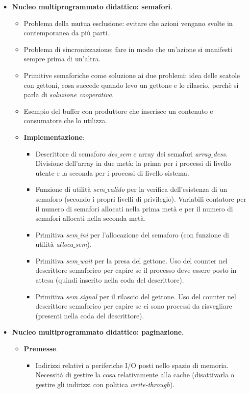 \begin{itemize}
	\item \textbf{Nucleo multiprogrammato didattico: semafori}.
	\begin{itemize}
		\item Problema della mutua esclusione: evitare che azioni vengano svolte in contemporanea da più parti.
		\item Problema di sincronizzazione: fare in modo che un'azione si manifesti sempre prima di un'altra.
		\item Primitive semaforiche come soluzione ai due problemi: idea delle scatole con gettoni, cosa succede quando levo un gettone e lo rilascio, perchè si parla di \emph{soluzione cooperativa}.
		\item Esempio del buffer con produttore che inserisce un contenuto e consumatore che lo utilizza. 
		\item \textbf{Implementazione}:
		\begin{itemize}
			\item Descrittore di semaforo \emph{des$\_$sem} e array dei semafori \emph{array$\_$dess}. Divisione dell'array in due metà: la prima per i processi di livello utente e la seconda per i processi di livello sistema.
			\item Funzione di utilità \emph{sem$\_$valido} per la verifica dell'esistenza di un semaforo (secondo i propri livelli di privilegio). Variabili contatore per il numero di semafori allocati nella prima metà e per il numero di semafori allocati nella seconda metà.
			\item Primitiva \emph{sem$\_$ini} per l'allocazione del semaforo (con funzione di utilità \emph{alloca$\_$sem}).
			\item Primitiva \emph{sem$\_$wait} per la presa del gettone. Uso del counter nel descrittore semaforico per capire se il processo deve essere posto in attesa (quindi inserito nella coda del descrittore).
			\item Primitiva  \emph{sem$\_$signal} per il rilascio del gettone. Uso del counter nel descrittore semaforico per capire se ci sono processi da risvegliare (presenti nella coda del descrittore).
		\end{itemize}
	\end{itemize}
	\item \textbf{Nucleo multiprogrammato didattico: paginazione}.
	\begin{itemize}
		\item \textbf{Premesse}. 
		\begin{itemize}
			\item Indirizzi relativi a periferiche I/O posti nello spazio di memoria. Necessità di gestire la cosa relativamente alla cache (disattivarla o gestire gli indirizzi con politica \emph{write-through}).

\end{itemize}
\end{itemize}
\end{itemize}

